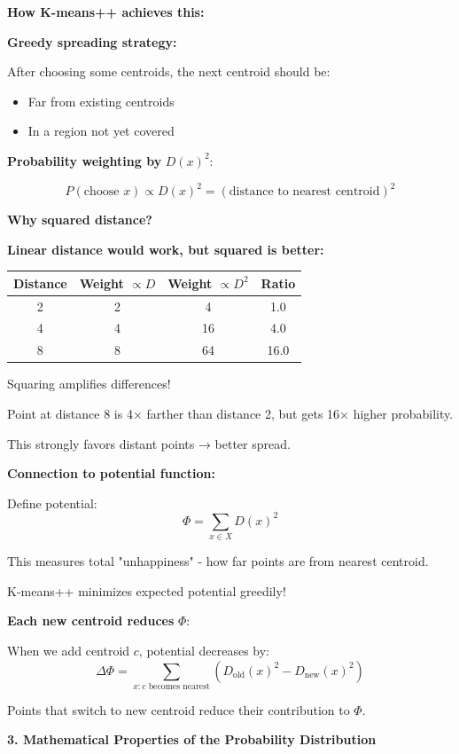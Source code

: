 \documentclass[12pt]{article}
\begin{document}
\begin{explanation}
\textbf{How K-means++ achieves this:}

\textbf{Greedy spreading strategy:}

After choosing some centroids, the next centroid should be:
\begin{itemize}
    \item Far from existing centroids
    \item In a region not yet covered
\end{itemize}

\textbf{Probability weighting by } $D(x)^2$:

\[
P(\text{choose } x) \propto D(x)^2 = (\text{distance to nearest centroid})^2
\]

\textbf{Why squared distance?}

\textbf{Linear distance would work, but squared is better:}

\begin{center}
\begin{tabular}{c|c|c|c}
Distance & Weight $\propto D$ & Weight $\propto D^2$ & Ratio \\
\hline
2 & 2 & 4 & 1.0 \\
4 & 4 & 16 & 4.0 \\
8 & 8 & 64 & 16.0 \\
\end{tabular}
\end{center}

Squaring amplifies differences!

Point at distance 8 is 4× farther than distance 2, but gets 16× higher probability.

This strongly favors distant points → better spread.

\textbf{Connection to potential function:}

Define potential:
\[
\Phi = \sum_{x \in X} D(x)^2
\]

This measures total "unhappiness" - how far points are from nearest centroid.

K-means++ minimizes expected potential greedily!

\textbf{Each new centroid reduces } $\Phi$:

When we add centroid $c$, potential decreases by:
\[
\Delta\Phi = \sum_{x: c \text{ becomes nearest}} (D_{\text{old}}(x)^2 - D_{\text{new}}(x)^2)
\]

Points that switch to new centroid reduce their contribution to $\Phi$.

\textbf{3. Mathematical Properties of the Probability Distribution}


\end{explanation}
\end{document}
